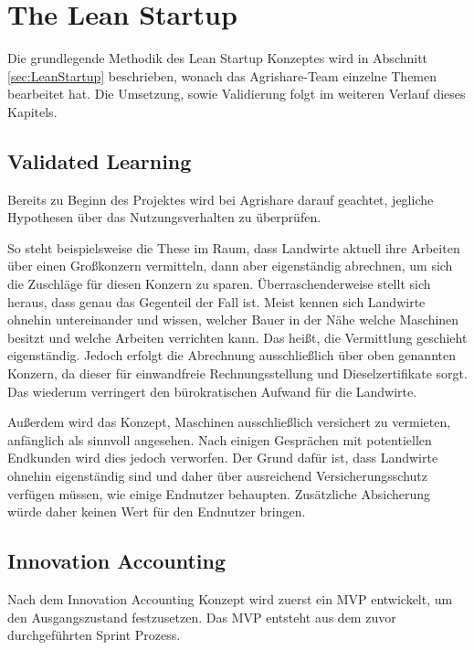 \section{The Lean Startup}
Die grundlegende Methodik des Lean Startup Konzeptes wird in Abschnitt \ref{sec:LeanStartup} beschrieben, wonach das Agrishare-Team einzelne Themen bearbeitet hat. Die Umsetzung, sowie Validierung folgt im weiteren Verlauf dieses Kapitels.
\subsection*{\label{sec:LeanStartup-Umsetzung-ValidatedLearning}\thesubsection\quad Validated Learning}
Bereits zu Beginn des Projektes wird bei Agrishare darauf geachtet, jegliche Hypothesen über das Nutzungsverhalten zu überprüfen. 

So steht beispielsweise die These im Raum, dass Landwirte aktuell ihre Arbeiten über einen Großkonzern vermitteln, dann aber eigenständig abrechnen, um sich die Zuschläge für diesen Konzern zu sparen. Überraschenderweise stellt sich heraus, dass genau das Gegenteil der Fall ist. Meist kennen sich Landwirte ohnehin untereinander und wissen, welcher Bauer in der Nähe welche Maschinen besitzt und welche Arbeiten verrichten kann. Das heißt, die Vermittlung geschieht eigenständig. Jedoch erfolgt die Abrechnung ausschließlich über oben genannten Konzern, da dieser für einwandfreie Rechnungsstellung und Dieselzertifikate sorgt. Das wiederum verringert den bürokratischen Aufwand für die Landwirte.

Außerdem wird das Konzept, Maschinen ausschließlich versichert zu vermieten, anfänglich als sinnvoll angesehen. Nach einigen Gesprächen mit potentiellen Endkunden wird dies jedoch verworfen. Der Grund dafür ist, dass Landwirte ohnehin eigenständig sind und daher über ausreichend Versicherungsschutz verfügen müssen, wie einige Endnutzer behaupten. Zusätzliche Absicherung würde daher keinen Wert für den Endnutzer bringen.

\subsection*{\label{sec:LeanStartup-Umsetzung-InnovationAccounting}\thesubsection\quad Innovation Accounting}
Nach dem Innovation Accounting Konzept wird zuerst ein MVP entwickelt, um den Ausgangszustand festzusetzen. Das \ac{MVP} entsteht aus dem zuvor durchgeführten Sprint Prozess.

